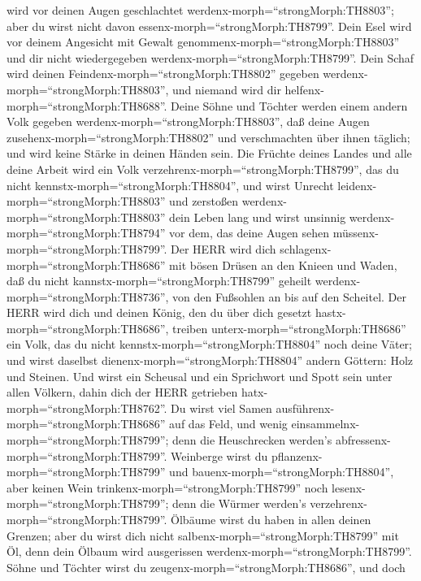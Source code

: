 wird vor deinen Augen geschlachtet werdenx-morph=``strongMorph:TH8803'';
aber du wirst nicht davon essenx-morph=``strongMorph:TH8799''. Dein Esel
wird vor deinem Angesicht mit Gewalt
genommenx-morph=``strongMorph:TH8803'' und dir nicht wiedergegeben
werdenx-morph=``strongMorph:TH8799''. Dein Schaf wird deinen
Feindenx-morph=``strongMorph:TH8802'' gegeben
werdenx-morph=``strongMorph:TH8803'', und niemand wird dir
helfenx-morph=``strongMorph:TH8688''.  Deine Söhne und
Töchter werden einem andern Volk gegeben
werdenx-morph=``strongMorph:TH8803'', daß deine Augen
zusehenx-morph=``strongMorph:TH8802'' und verschmachten über ihnen
täglich; und wird keine Stärke in deinen Händen sein.  Die
Früchte deines Landes und alle deine Arbeit wird ein Volk
verzehrenx-morph=``strongMorph:TH8799'', das du nicht
kennstx-morph=``strongMorph:TH8804'', und wirst Unrecht
leidenx-morph=``strongMorph:TH8803'' und zerstoßen
werdenx-morph=``strongMorph:TH8803'' dein Leben lang  und
wirst unsinnig werdenx-morph=``strongMorph:TH8794'' vor dem, das deine
Augen sehen müssenx-morph=``strongMorph:TH8799''.  Der HERR
wird dich schlagenx-morph=``strongMorph:TH8686'' mit bösen Drüsen an den
Knieen und Waden, daß du nicht kannstx-morph=``strongMorph:TH8799''
geheilt werdenx-morph=``strongMorph:TH8736'', von den Fußsohlen an bis
auf den Scheitel.  Der HERR wird dich und deinen König, den
du über dich gesetzt hastx-morph=``strongMorph:TH8686'', treiben
unterx-morph=``strongMorph:TH8686'' ein Volk, das du nicht
kennstx-morph=``strongMorph:TH8804'' noch deine Väter; und wirst
daselbst dienenx-morph=``strongMorph:TH8804'' andern Göttern: Holz und
Steinen.  Und wirst ein Scheusal und ein Sprichwort und
Spott sein unter allen Völkern, dahin dich der HERR getrieben
hatx-morph=``strongMorph:TH8762''.  Du wirst viel Samen
ausführenx-morph=``strongMorph:TH8686'' auf das Feld, und wenig
einsammelnx-morph=``strongMorph:TH8799''; denn die Heuschrecken werden's
abfressenx-morph=``strongMorph:TH8799''.  Weinberge wirst
du pflanzenx-morph=``strongMorph:TH8799'' und
bauenx-morph=``strongMorph:TH8804'', aber keinen Wein
trinkenx-morph=``strongMorph:TH8799'' noch
lesenx-morph=``strongMorph:TH8799''; denn die Würmer werden's
verzehrenx-morph=``strongMorph:TH8799''.  Ölbäume wirst du
haben in allen deinen Grenzen; aber du wirst dich nicht
salbenx-morph=``strongMorph:TH8799'' mit Öl, denn dein Ölbaum wird
ausgerissen werdenx-morph=``strongMorph:TH8799''.  Söhne
und Töchter wirst du zeugenx-morph=``strongMorph:TH8686'', und doch
